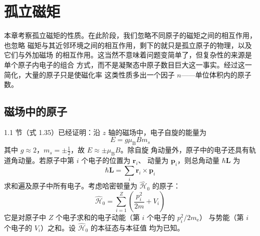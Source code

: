 \chapter{孤立磁矩}

本章考察孤立磁矩的性质。在此阶段，我们忽略不同原子的磁矩之间的相互作用，也忽略
磁矩与其近邻环境之间的相互作用，剩下的就只是孤立原子的物理，以及它们与外加磁场
的相互作用。这当然不意味着问题变简单了，但复杂性的来源是单个原子内电子的组合
方式，而不是凝聚态中原子数目巨大这一事实。经过这一简化，大量的原子只是使磁化率
这类性质多出一个因子 $n$——单位体积内的原子数。

\section{磁场中的原子}

1.1 节（式 1.35）已经证明：沿 $z$ 轴的磁场中，电子自旋的能量为
\begin{equation*}
E = g\mu_{\mathrm{B}}Bm_s\tag{2.1}
\end{equation*}
其中 $g\approx2$，$m_s=\pm\frac{1}{2}$，故 $E\approx\pm\mu_{\mathrm{B}}B$。除自旋
角动量外，原子中的电子还具有轨道角动量。若原子中第 $i$ 个电子的位置为 $\mathbf{r}_i$、
动量为 $\mathbf{p}_i$，则总角动量 $\hbar\mathbf{L}$ 为
\begin{equation*}
\hbar\mathbf{L} = \sum_i \mathbf{r}_i\times\mathbf{p}_i\tag{2.2}
\end{equation*}
求和遍及原子中所有电子。考虑哈密顿量为 $\hat{\mathcal{H}}_0$ 的原子：
\begin{equation*}
\hat{\mathcal{H}}_0 = \sum_{i=1}^{Z}\left(\frac{p_i^{2}}{2m} + V_i\right)\tag{2.3}
\end{equation*}
它是对原子中 $Z$ 个电子求和的电子动能（第 $i$ 个电子的 $p_i^{2}/2m_{\mathrm{e}}$）
与势能（第 $i$ 个电子的 $V_i$）之和。设 $\hat{\mathcal{H}}_0$ 的本征态与本征值
均为已知。

